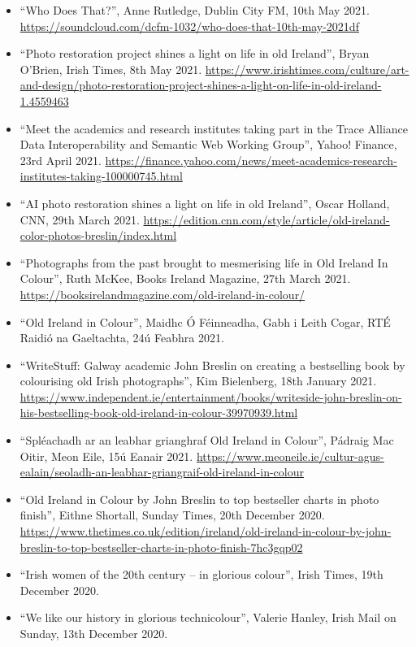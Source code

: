 \documentclass[10pt,a4paper]{res} %
\begin{document}
\begin{resume}
{\begin{itemize}
\item ``Who Does That?'', Anne Rutledge, Dublin City FM, 10th May 2021. \url{https://soundcloud.com/dcfm-1032/who-does-that-10th-may-2021df}
\item ``Photo restoration project shines a light on life in old Ireland'', Bryan O'Brien, Irish Times, 8th May 2021. \url{https://www.irishtimes.com/culture/art-and-design/photo-restoration-project-shines-a-light-on-life-in-old-ireland-1.4559463}
\item ``Meet the academics and research institutes taking part in the Trace Alliance Data Interoperability and Semantic Web Working Group'', Yahoo! Finance, 23rd April 2021. \url{https://finance.yahoo.com/news/meet-academics-research-institutes-taking-100000745.html}
\item ``AI photo restoration shines a light on life in old Ireland'', Oscar Holland, CNN, 29th March 2021. \url{https://edition.cnn.com/style/article/old-ireland-color-photos-breslin/index.html}
\item ``Photographs from the past brought to mesmerising life in Old Ireland In Colour'', Ruth McKee, Books Ireland Magazine, 27th March 2021. \url{https://booksirelandmagazine.com/old-ireland-in-colour/}
\item ``Old Ireland in Colour'', Maidhc \'{O} F\'{e}inneadha, Gabh i Leith Cogar, RT\'{E} Raidi\'{o} na Gaeltachta, 24\'{u} Feabhra 2021.
\item ``WriteStuff: Galway academic John Breslin on creating a bestselling book by colourising old Irish photographs'', Kim Bielenberg, 18th January 2021. \url{https://www.independent.ie/entertainment/books/writeside-john-breslin-on-his-bestselling-book-old-ireland-in-colour-39970939.html}
\item ``Spl\'{e}achadh ar an leabhar grianghraf Old Ireland in Colour'', P\'{a}draig Mac Oitir, Meon Eile, 15\'{u} Eanair 2021. \url{https://www.meoneile.ie/cultur-agus-ealain/seoladh-an-leabhar-griangraif-old-ireland-in-colour}
\item ``Old Ireland in Colour by John Breslin to top bestseller charts in photo finish'', Eithne Shortall, Sunday Times, 20th December 2020. \url{https://www.thetimes.co.uk/edition/ireland/old-ireland-in-colour-by-john-breslin-to-top-bestseller-charts-in-photo-finish-7hc3gqp02}
\item ``Irish women of the 20th century – in glorious colour'', Irish Times, 19th December 2020.
\item ``We like our history in glorious technicolour'', Valerie Hanley, Irish Mail on Sunday, 13th December 2020.

\end{itemize}}
\end{resume}
\end{document}
